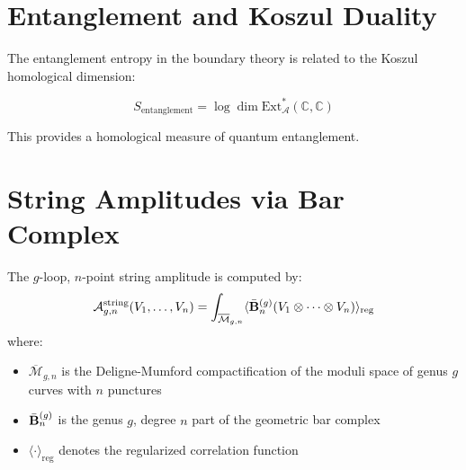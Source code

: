 \section{Entanglement and Koszul Duality}

\begin{conjecture}[Entanglement = Koszul Complexity]
The entanglement entropy in the boundary theory is related to the Koszul homological dimension:

$$S_{\text{entanglement}} = \log \dim \text{Ext}^*_{\mathcal{A}}(\mathbb{C}, \mathbb{C})$$

This provides a homological measure of quantum entanglement.
\end{conjecture}

\section{String Amplitudes via Bar Complex}

\begin{theorem}\label{thm:string-amplitude}
The $g$-loop, $n$-point string amplitude is computed by:
$$\mathcal{A}_{g,n}^{\text{string}}(V_1, \ldots, V_n) = \int_{\overline{\mathcal{M}}_{g,n}} \langle \bar{\mathbf{B}}^{(g)}_n (V_1 \otimes \cdots \otimes V_n) \rangle_{\text{reg}}$$
where:
\begin{itemize}
\item $\overline{\mathcal{M}}_{g,n}$ is the Deligne-Mumford compactification of the moduli space of genus $g$ curves with $n$ punctures
\item $\bar{\mathbf{B}}^{(g)}_n$ is the genus $g$, degree $n$ part of the geometric bar complex
\item $\langle \cdot \rangle_{\text{reg}}$ denotes the regularized correlation function
\end{itemize}
\end{theorem}

